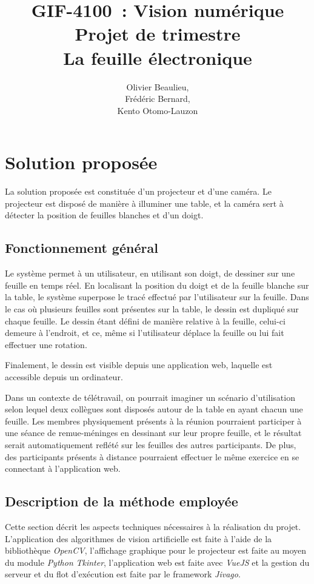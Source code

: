 \documentclass[11pt]{report}
\title{\textbf{GIF-4100 : Vision numérique\\ Projet de trimestre \\La feuille électronique}}
\author{Olivier Beaulieu,\\Frédéric Bernard,\\Kento Otomo-Lauzon}
\begin{document}
\maketitle
 

\newpage

\chapter{Solution proposée}
La solution proposée est constituée d'un projecteur et d'une caméra. Le
projecteur est disposé de manière à illuminer une table, et la caméra sert à
détecter la position de feuilles blanches et d'un doigt.

\section{Fonctionnement général}
Le système permet à un utilisateur, en utilisant son doigt, de dessiner sur une
feuille en temps réel. En localisant la position du doigt et de la feuille
blanche sur la table, le système superpose le tracé effectué par l'utilisateur
sur la feuille. Dans le cas où plusieurs feuilles sont présentes sur la table,
le dessin est dupliqué sur chaque feuille. Le dessin étant défini de manière
relative à la feuille, celui-ci demeure à l'endroit, et ce, même si
l'utilisateur déplace la feuille ou lui fait effectuer une rotation.

Finalement, le dessin est visible depuis une application web, laquelle est
accessible depuis un ordinateur.

Dans un contexte de télétravail, on pourrait imaginer un scénario d'utilisation
selon lequel deux collègues sont disposés autour de la table en ayant chacun une
feuille. Les membres physiquement présents à la réunion pourraient participer à
une séance de remue-méninges en dessinant sur leur propre feuille, et le
résultat serait automatiquement reflété sur les feuilles des autres
participants. De plus, des participants présents à distance pourraient effectuer
le même exercice en se connectant à l'application web. 

\section{Description de la méthode employée}
Cette section décrit les aspects techniques nécessaires à la réalisation du
projet. L'application des algorithmes de vision artificielle est faite à l'aide
de la bibliothèque \textit{OpenCV}, l'affichage graphique pour le projecteur est
faite au moyen du module \textit{Python} \textit{Tkinter}, l'application web est
faite avec \textit{VueJS} et la gestion du serveur et du flot d'exécution est
faite par le framework \textit{Jivago}. 
\end{document}
